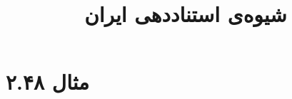 \documentclass[a4paper,10pt]{article}
\begin{document}
\title{شیوه‌ی استناددهی ایران}
\author{}
\date{}
\maketitle



\section*{مثال ۲.۴۸}

\cite{برنامه1380}\\
\cite{هما1375}\\
\\
\\






\end{document}
